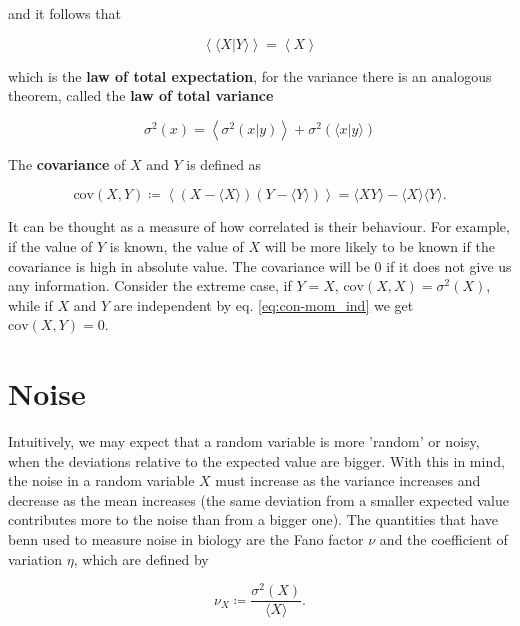 and it follows that

\begin{equation*}
  \left\langle\langle X|Y\rangle\right\rangle = \left\langle X\right\rangle
\end{equation*}

which is the \textbf{law of total expectation}, for the variance there is an analogous theorem, called the \textbf{law of total variance}

\begin{equation*}
  \sigma^2(x) = \left\langle\sigma^2(x|y)\right\rangle + \sigma^2\left(\langle x|y\rangle\right)
\end{equation*}

The \textbf{covariance} of $X$ and $Y$ is defined as

\begin{equation*}
  \text{cov}(X,Y) \coloneqq \left\langle\left(X-\langle X\rangle\right)\left(Y-\langle Y\rangle\right)\right\rangle = \langle XY\rangle - \langle X\rangle\langle Y\rangle.
\end{equation*}

It can be thought as a measure of how correlated is their behaviour. For example, if the value of $Y$ is known, the value of $X$ will be more likely to be known if the covariance is high in absolute value. The covariance will be $0$ if it does not give us any information. Consider the extreme case, if $Y=X$, $\text{cov}(X,X) = \sigma^2(X)$, while if $X$ and $Y$ are independent by eq. \eqref{eq:con-mom_ind} we get $\text{cov}(X,Y) = 0$.

\section{Noise}
\label{sec:con-noise}
Intuitively, we may expect that a random variable is more 'random' or noisy, when the deviations relative to the expected value are bigger. With this in mind, the noise in a random variable $X$ must increase as the variance increases and decrease as the mean increases (the same deviation from a smaller expected value contributes more to the noise than from a bigger one). The quantities that have benn used to measure noise in biology are the Fano factor $\nu$ and the coefficient of variation $\eta$, which are defined by

\begin{equation}
  \label{eq:con-fano_def}
  \nu_X \coloneqq \frac{\sigma^2(X)}{\langle X \rangle}.
\end{equation}

